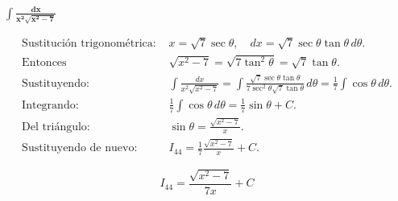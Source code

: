 $\displaystyle \mathbf{\int \frac{dx}{x^{2}\sqrt{x^{2}-7}}}$

\nopagebreak
\begin{align*}
\text{Sustitución trigonométrica: } 
&x = \sqrt{7}\sec\theta, 
\quad dx = \sqrt{7}\sec\theta\tan\theta\,d\theta. \\[4pt]
\text{Entonces } 
&\sqrt{x^{2}-7} = \sqrt{7\tan^{2}\theta} = \sqrt{7}\tan\theta. \\[4pt]
\text{Sustituyendo: } 
&\int \frac{dx}{x^{2}\sqrt{x^{2}-7}}
= \int \frac{\sqrt{7}\sec\theta\tan\theta}
{7\sec^{2}\theta\sqrt{7}\tan\theta}\,d\theta
= \tfrac{1}{7}\int \cos\theta\,d\theta. \\[4pt]
\text{Integrando: } 
&\tfrac{1}{7}\int \cos\theta\,d\theta 
= \tfrac{1}{7}\sin\theta + C. \\[4pt]
\text{Del triángulo: } 
&\sin\theta = \frac{\sqrt{x^{2}-7}}{x}. \\[4pt]
\text{Sustituyendo de nuevo: } 
&I_{44} = \tfrac{1}{7}\frac{\sqrt{x^{2}-7}}{x} + C.
\end{align*}

$$
\boxed{\displaystyle 
I_{44} = \frac{\sqrt{x^{2}-7}}{7x} + C}
$$

